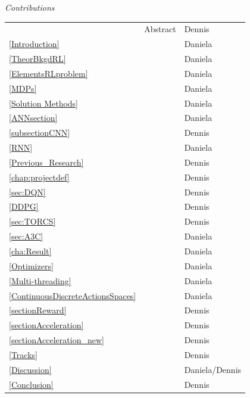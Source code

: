 \newpage
\thispagestyle{empty}
\begin{center}
	\textsl{\HUGE Contributions}
\end{center}
\begin{table}[H]
	\begin{tabular}{lll}
		& Abstract & Dennis \\
		\ref{Introduction} & \nameref{Introduction} & Daniela \\
		\ref{TheorBkgdRL} & \nameref{TheorBkgdRL} & Daniela \\
		\ref{ElementsRLproblem} & \nameref{ElementsRLproblem} & Daniela \\
		\ref{MDPs} & \nameref{MDPs} & Daniela \\
		\ref{Solution Methods} & \nameref{Solution Methods} & Daniela \\
		\ref{ANNsection} & \nameref{ANNsection} & Daniela \\
		\ref{subsectionCNN} & \nameref{subsectionCNN} & Dennis \\
		\ref{RNN} & \nameref{RNN} & Daniela \\
		\ref{Previous_Research} & \nameref{Previous_Research} & Dennis \\
		\ref{chap:projectdef} & \nameref{chap:projectdef} & Dennis \\
		\ref{sec:DQN} & \nameref{sec:DQN} & Dennis \\
		\ref{DDPG} & \nameref{DDPG} & Dennis \\
		\ref{sec:TORCS} & \nameref{sec:TORCS} & Dennis \\
		\ref{sec:A3C} & \nameref{sec:A3C} & Daniela \\
		\ref{cha:Result} & \nameref{cha:Result} & Daniela \\
		\ref{Optimizers} & \nameref{Optimizers} & Daniela \\
		\ref{Multi-threading} & \nameref{Multi-threading} & Daniela \\
		\ref{ContinuousDiscreteActionsSpaces} & \nameref{ContinuousDiscreteActionsSpaces} & Daniela \\
		\ref{sectionReward} & \nameref{sectionReward} & Dennis \\
		\ref{sectionAcceleration} & \nameref{sectionAcceleration} & Dennis \\
		\ref{sectionAcceleration_new} & \nameref{sectionAcceleration_new} & Dennis \\
		\ref{Tracks} & \nameref{Tracks} & Dennis \\
		\ref{Discussion} & \nameref{Discussion} & Daniela/Dennis  \\
		\ref{Conclusion} & \nameref{Conclusion} & Dennis  
	\end{tabular}
\end{table}